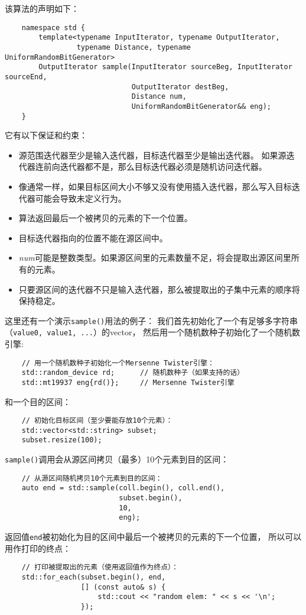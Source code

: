 该算法的声明如下：
\begin{lstlisting}
    namespace std {
        template<typename InputIterator, typename OutputIterator,
                 typename Distance, typename UniformRandomBitGenerator>
        OutputIterator sample(InputIterator sourceBeg, InputIterator sourceEnd,
                              OutputIterator destBeg,
                              Distance num,
                              UniformRandomBitGenerator&& eng);
    }
\end{lstlisting}
它有以下保证和约束：
\begin{itemize}
    \item 源范围迭代器至少是输入迭代器，目标迭代器至少是输出迭代器。
    如果源迭代器连前向迭代器都不是，那么目标迭代器必须是随机访问迭代器。
    \item 像通常一样，如果目标区间大小不够又没有使用插入迭代器，那么写入目标迭代器可能会导致未定义行为。
    \item 算法返回最后一个被拷贝的元素的下一个位置。
    \item 目标迭代器指向的位置不能在源区间中。
    \item \emph{num}可能是整数类型。如果源区间里的元素数量不足，将会提取出源区间里所有的元素。
    \item 只要源区间的迭代器不只是输入迭代器，那么被提取出的子集中元素的顺序将保持稳定。
\end{itemize}
这里还有一个演示\texttt{sample()}用法的例子：
我们首先初始化了一个有足够多字符串（\texttt{value0, value1, ...}）的vector，
然后用一个随机数种子初始化了一个随机数引擎:
\begin{lstlisting}
    // 用一个随机数种子初始化一个Mersenne Twister引擎：
    std::random_device rd;      // 随机数种子（如果支持的话）
    std::mt19937 eng{rd()};     // Mersenne Twister引擎
\end{lstlisting}
和一个目的区间：
\begin{lstlisting}
    // 初始化目标区间（至少要能存放10个元素）：
    std::vector<std::string> subset;
    subset.resize(100);
\end{lstlisting}
\texttt{sample()}调用会从源区间拷贝（最多）10个元素到目的区间：
\begin{lstlisting}
    // 从源区间随机拷贝10个元素到目的区间：
    auto end = std::sample(coll.begin(), coll.end(),
                           subset.begin(),
                           10,
                           eng);
\end{lstlisting}
返回值\texttt{end}被初始化为目的区间中最后一个被拷贝的元素的下一个位置，
所以可以用作打印的终点：
\begin{lstlisting}
    // 打印被提取出的元素（使用返回值作为终点）：
    std::for_each(subset.begin(), end,
                  [] (const auto& s) {
                      std::cout << "random elem: " << s << '\n';
                  });
\end{lstlisting}

